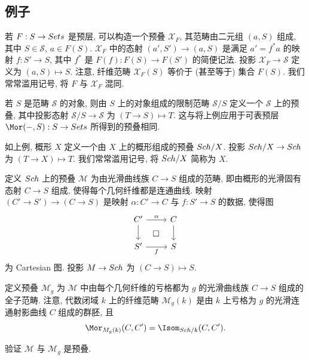 \subsection{例子}\label{src:3.4.2-subsection}
\begin{example}[预层作为预叠]\label{src:3.4.7}
若 $F:S\to Sets$ 是预层, 可以构造一个预叠 $\mathcal X_F$, 其范畴由二元组 $(a,S)$ 组成, 其中 $S\in\mathcal S$, $a\in F(S)$. $\mathcal X_F$ 中的态射 $(a',S')\to(a,S)$ 是满足 $a'=f^*a$ 的映射 $f:S'\to S$, 其中 $f^*$ 是 $F(f):F(S)\to F(S')$ 的简便记法. 投影 $\mathcal X_F\to\mathcal S$ 定义为 $(a,S)\mapsto S$. 注意, 纤维范畴 $\mathcal X_F(S)$ 等价于 (甚至等于) 集合 $F(S)$. 我们常常滥用记号, 将 $F$ 与 $\mathcal X_F$ 混同.
\end{example}
\begin{example}[可表预叠]\label{src:3.4.8}
若 $S$ 是范畴 $\mathcal S$ 的对象, 则由 $S$ 上的对象组成的限制范畴 $\mathcal S/S$ 定义一个 $\mathcal S$ 上的预叠, 其中投影态射 $\mathcal S/S\to\mathcal S$ 为 $(T\to S)\mapsto T$. 这与将上例应用于可表预层 $\Mor(-,S):\mathcal S\to\Sets$ 所得到的预叠相同.
\end{example}
\begin{example}[概形作为预叠]\label{src:3.4.9}
如上例, 概形 $X$ 定义一个由 $X$ 上的概形组成的预叠 $Sch/X$. 投影 $Sch/X\to Sch$ 为 $(T\to X)\mapsto T$. 我们常常滥用记号, 将 $Sch/X$ 简称为 $X$.
\end{example}
\begin{example}[光滑曲线的预叠]\label{src:3.4.10}
定义 $Sch$ 上的预叠 $\mathcal M$ 为由光滑曲线族 $C\to S$ 组成的范畴, 即由概形的光滑固有态射 $C\to S$ 组成, 使得每个几何纤维都是连通曲线. 映射 $(C'\to S')\to(C\to S)$ 是映射 $\alpha:C'\to C$ 与 $f:S'\to S$ 的数据, 使得图
\[
\begin{tikzcd}
C'\arrow[r,"\alpha"]\arrow[d]\arrow[dr,phantom,"\square"]&C\arrow[d]\\
S'\arrow[r,"f"']&S
\end{tikzcd}
\]
为 Cartesian 图. 投影 $M\to Sch$ 为 $(C\to S)\mapsto S$.

定义预叠 $\mathcal M_g$ 为 $\mathcal M$ 中由每个几何纤维的亏格都为 $g$ 的光滑曲线族 $C\to S$ 组成的全子范畴. 注意, 代数闭域 $k$ 上的纤维范畴 $\mathcal M_g(k)$ 是由 $k$ 上亏格为 $g$ 的光滑连通射影曲线 $C$ 组成的群胚, 且
\[
\Mor_{\mathcal M_g(k)}(C,C')=\Isom_{\Sch/k}(C,C').
\]
\end{example}
\begin{exercise}[简单但重要]\label{src:3.4.11}
验证 $\mathcal M$ 与 $\mathcal M_g$ 是预叠.
\end{exercise}
